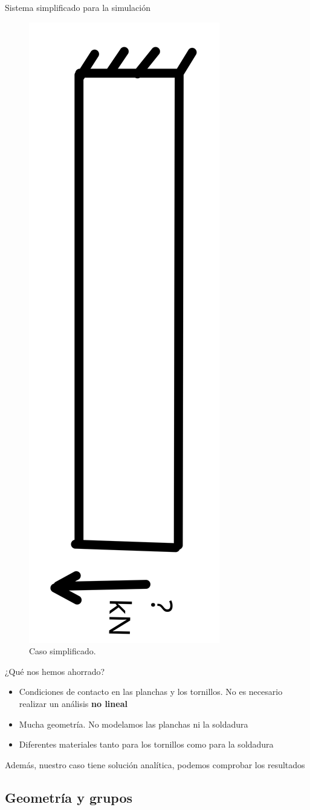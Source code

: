 \documentclass[12pt]{beamer}
\begin{document}
\begin{frame}{Sistema simplificado para la simulación}
	\begin{figure}
		\centering
		\includegraphics[width=0.3\linewidth,angle=90]{simplifiedcase}
		\caption{Caso simplificado.}
		\label{fig:simplifiedcase}
	\end{figure}
\end{frame}

\begin{frame}{¿Qué nos hemos ahorrado?}
	\begin{itemize}[label=$\checkmark$]
		\item Condiciones de contacto en las planchas y los tornillos. No es necesario realizar un análisis \textbf{no lineal}
		\item Mucha geometría. No modelamos las planchas ni la soldadura
		\item Diferentes materiales tanto para los tornillos como para la soldadura
	\end{itemize}
	Además, nuestro caso tiene solución analítica, podemos comprobar los resultados
\end{frame}

\subsection{Geometría y grupos}
\end{document}
